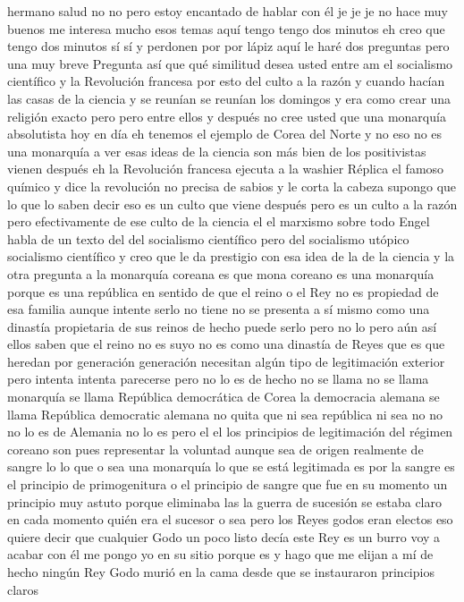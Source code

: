 hermano salud no no pero estoy encantado de hablar con él
je je je no hace muy buenos me interesa mucho esos temas aquí tengo tengo dos minutos eh
creo que tengo dos minutos sí sí y perdonen por por lápiz aquí le haré dos preguntas pero una muy breve
Pregunta
así que qué similitud desea usted entre am el socialismo científico y la Revolución francesa
por esto del culto a la razón y cuando hacían las casas de la ciencia y se reunían se reunían los domingos y era como crear una religión
exacto pero pero entre ellos y después no cree usted que una monarquía absolutista
hoy en día eh tenemos el ejemplo de Corea del Norte y no eso no es una monarquía
a ver esas ideas de la ciencia son más bien de los positivistas vienen después eh la Revolución francesa ejecuta a la washier
Réplica
el famoso químico y dice la revolución no precisa de sabios y le corta la cabeza supongo que lo que lo saben decir
eso es un culto que viene después pero es un culto a la razón pero efectivamente de ese culto de la ciencia el el marxismo sobre todo
Engel habla de un texto del del socialismo científico pero del socialismo utópico socialismo científico
y creo que le da prestigio con esa idea de la de la ciencia y la otra pregunta a la monarquía
coreana es que mona coreano es una monarquía porque es una república en sentido de que el reino o el Rey no es propiedad de esa familia
aunque intente serlo no tiene no se presenta a sí mismo como una dinastía propietaria de sus reinos
de hecho puede serlo pero no lo pero aún así ellos saben que el reino no es suyo no es como una dinastía de Reyes
que es que heredan por generación generación necesitan algún tipo de legitimación exterior pero intenta
intenta parecerse pero no lo es de hecho no se llama no se llama monarquía se llama República democrática de Corea
la democracia alemana se llama República democratic alemana no quita que ni sea república ni sea no
no no lo es de Alemania no lo es pero el el los principios de legitimación del régimen coreano son
pues representar la voluntad aunque sea de origen realmente de sangre lo lo que o sea una monarquía
lo que se está legitimada es por la sangre es el principio de primogenitura o el principio de sangre que fue en su momento un principio muy astuto
porque eliminaba las la guerra de sucesión se estaba claro en cada momento quién era el sucesor o sea pero los Reyes godos eran electos
eso quiere decir que cualquier Godo un poco listo decía este Rey es un burro voy a acabar con él me pongo yo en su sitio porque es
y hago que me elijan a mí de hecho ningún Rey Godo murió en la cama desde que se instauraron principios claros
